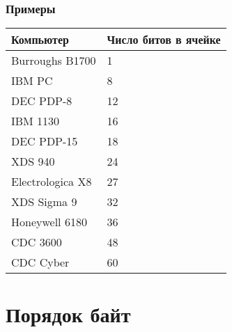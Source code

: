 \begin{frame}[fragile]
\frametitle{Примеры}
\centering
\begin{tabular}{lp{2.1cm}}
    \toprule
    \textbf{Компьютер} & \textbf{Число битов в ячейке}\\
    \midrule
    Burroughs B1700  & 1 \\
    IBM PC           & 8 \\
    DEC PDP-8        & 12\\
    IBM 1130         & 16\\
    DEC PDP-15       & 18\\
    XDS 940          & 24\\
    Electrologica X8 & 27\\
    XDS Sigma 9      & 32\\
    Honeywell 6180   & 36\\
    CDC 3600         & 48\\
    CDC Cyber        & 60\\
    \bottomrule
\end{tabular}

\end{frame}

\section {Порядок байт}

